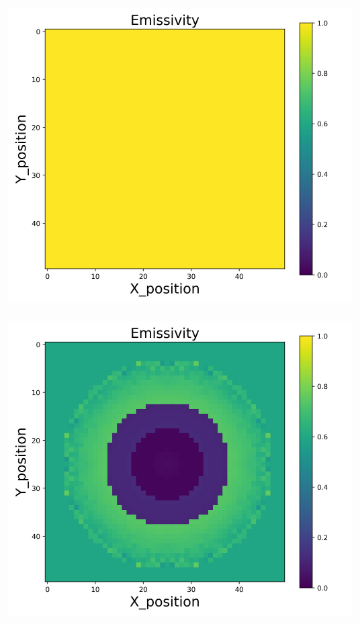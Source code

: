 {\begin{figure}[p]
\begin{minipage}{\textwidth}
\begin{subfigure}{0.325\textwidth}
        \end{subfigure}
        \begin{subfigure}{0.325\textwidth}
            \centering
            \includegraphics[width=\textwidth]{figures/raw_data/5/linear/emi_cal.jpg}
        \end{subfigure}
        \begin{subfigure}{0.325\textwidth}
            \centering
            \includegraphics[width=\textwidth]{figures/raw_data/21/linear/emi_cal.jpg}

\end{subfigure}
\end{minipage}
\end{figure}}
